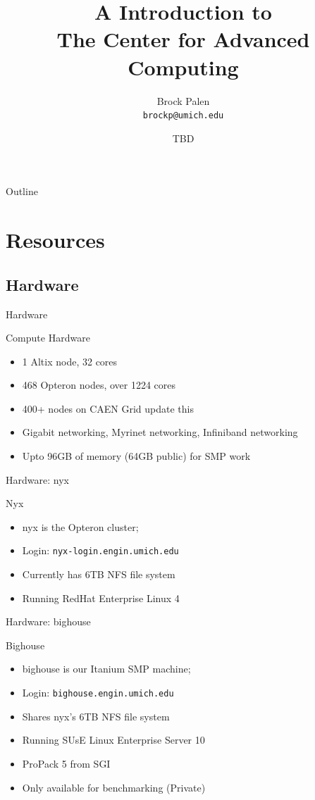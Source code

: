 \documentclass{beamer}
\title[CAC Intro] {A Introduction to\\ The Center for Advanced Computing}
\author{Brock Palen\\ \texttt{brockp@umich.edu}}
\date{TBD}
\begin{document}
  \begin{frame}
    \titlepage
  \end{frame}

  \begin{frame}{Outline}
    \tableofcontents
  \end{frame}
  
  \section{Resources}
  \subsection {Hardware}

  \begin{frame}{Hardware}
   \begin{block}{Compute Hardware}
    \begin{itemize}
    \item 1 Altix node, 32 cores
    \item 468 Opteron nodes, over 1224 cores
    \item 400+ nodes on CAEN Grid
    \alert{update this}
    \item Gigabit networking, Myrinet networking, Infiniband networking
    \item Upto 96GB of memory (64GB public) for SMP work
    \end{itemize}
   \end{block}
  \end{frame}
  \begin{frame}{Hardware: nyx}
    \begin{block}{Nyx}
    \begin{itemize}
    \item nyx is the Opteron cluster;
    \item Login: \texttt{nyx-login.engin.umich.edu}
    \item Currently has 6TB NFS file system
    \item Running RedHat Enterprise Linux 4
    \end{itemize}
   \end{block}
  \end{frame}
  \begin{frame}{Hardware: bighouse}
    \begin{block}{Bighouse}
    \begin{itemize}
      \item bighouse is our Itanium SMP machine;
      \item Login: \texttt{bighouse.engin.umich.edu}
      \item Shares nyx's 6TB NFS file system
      \item Running SUsE Linux Enterprise Server 10
      \item ProPack 5 from SGI
      \item Only available for benchmarking (Private)
    \end{itemize}
   \end{block}
  \end{frame}
\end{document}

